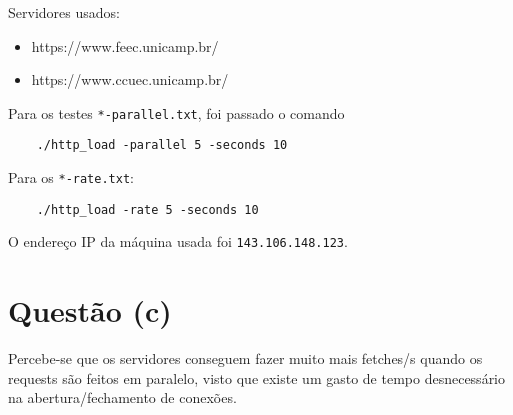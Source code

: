 \documentclass{article}
\begin{document}
Servidores usados:

\begin{itemize}
    \item https://www.feec.unicamp.br/
    \item https://www.ccuec.unicamp.br/
\end{itemize}

Para os testes \texttt{*-parallel.txt}, foi passado o comando

\begin{verbatim}
    ./http_load -parallel 5 -seconds 10 
\end{verbatim}

Para os \texttt{*-rate.txt}:

\begin{verbatim}
    ./http_load -rate 5 -seconds 10 
\end{verbatim}

O endereço IP da máquina usada foi \texttt{143.106.148.123}.

\section*{Questão (c)}

Percebe-se que os servidores conseguem fazer muito mais fetches/s quando os requests são feitos em paralelo, visto que existe um gasto de tempo desnecessário na abertura/fechamento de conexões.
\end{document}
